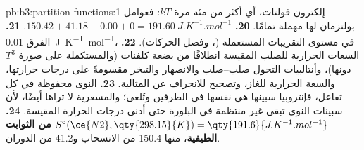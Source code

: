 \begin{solution}{pb:b3:partition-functions:1}
إلكترون فولتات، أي أكثر من مئة مرة $kT$: فعوامل بولتزمان لها
مهملة تمامًا.
\textbf{20.} $150.42 + 41.18 + 0.00 + 0 = \qty{191.60}{J.K^{-1}.mol^{-1}}$.
\textbf{21.} الفرق \qty{0.01}{J.K^{-1}.mol^{-1}}، في مستوى
التقريبات المستعملة (، وفصل الحركات).
\textbf{22.} السعات الحرارية للصلب المقيسة انطلاقًا من بضعة كلفنات (والمستكملة
على صورة $T^3$ دونها)، وأنتالبيات التحول صلب--صلب والانصهار
والتبخر مقسومةً على درجات حرارتها، والسعة الحرارية للغاز،
وتصحيح للانحراف عن المثالية.
\textbf{23.} النوى محفوظة في كل تفاعل، فإنتروبيا سبينها هي
نفسها في الطرفين وتُلغى؛ والمسعرية لا تراها أيضًا، لأن
سبينات النوى تبقى غير منتظمة في البلورة حتى أدنى درجات الحرارة
المقيسة.
\textbf{24.} \textbf{$S^\circ(\ce{N2}, \qty{298.15}{K}) = \qty{191.6}{J.K^{-1}.mol^{-1}}$ من الثوابت الطيفية}،
منها 150.4 من الانسحاب و41.2 من الدوران.
\end{solution}
